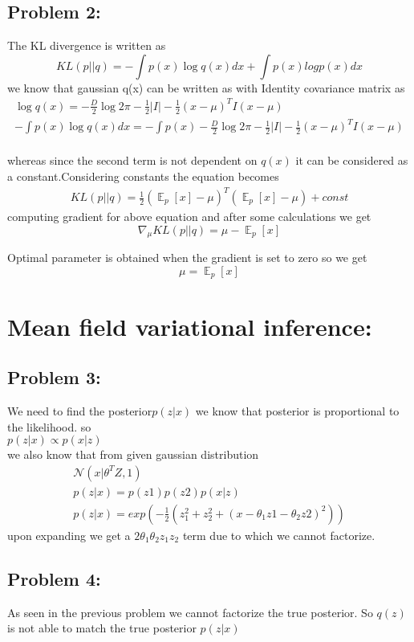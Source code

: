 \documentclass[5pt,a4paper]{article}
\DeclareMathOperator{\E}{\mathbb{E}}
\begin{document}
	
	\subsection*{Problem 2:}
	The KL divergence is written as 
	\begin{equation}
	KL(p||q) = -\int p(x) \log q(x) dx + \int p(x) log p(x) dx
	\end{equation}
	we know that gaussian q(x) can be written as with Identity covariance matrix as
	\begin{eqnarray}
	\log q(x) = -\frac{D}{2}\log 2\pi -\frac{1}{2}|I| - \frac{1}{2}(x - \mu)^T I (x- \mu)\\
	-\int p(x) \log q(x) dx = -\int p(x)  -\frac{D}{2}\log 2\pi -\frac{1}{2}|I| - \frac{1}{2}(x - \mu)^T I (x- \mu)\\
	\end{eqnarray}
	
	whereas since the second term is not dependent on $ q(x) $ it can be considered as a constant.Considering constants the equation becomes\\
	
	\begin{eqnarray}
	KL(p||q) = \frac{1}{2}(\E_p[x] - \mu)^T(\E_p[x]-\mu) +const
	\end{eqnarray}
	computing gradient for above equation and after some calculations we get 
	\begin{equation}
	\nabla_{\mu} KL(p||q) = \mu - \E_p[x]
	\end{equation}
	
	Optimal parameter is obtained when the gradient is set to zero so we get 
	\begin{equation}
	\mu = \E_p[x]
	\end{equation}
	
	\section{Mean field variational inference:}
	\subsection*{Problem 3:}
	We need to find the posterior$ p(z|x) $ we know that posterior is proportional to the likelihood.
	so \\
	$ p(z|x) \propto p(x|z) $\\
	we also know that from given gaussian distribution
	\begin{eqnarray}
	\mathcal{N}(x|\theta^TZ,1)\\ 
	p(z|x) = p(z1)p(z2)p(x|z)\\
	p(z|x) = exp(-\frac{1}{2}(z_1^2+z_2^2+(x - \theta_1 z1 - \theta_2 z2)^2))
	\end{eqnarray}
	upon expanding we get a $ 2 \theta_1\theta_2z_1z_2 $ term due to which we cannot factorize.
	
	
	
	\subsection*{Problem 4:}
	As seen in the previous problem we cannot factorize the true posterior. So $ q(z) $ is not able to match the true posterior $ p(z|x)$
	
	
\end{document}
